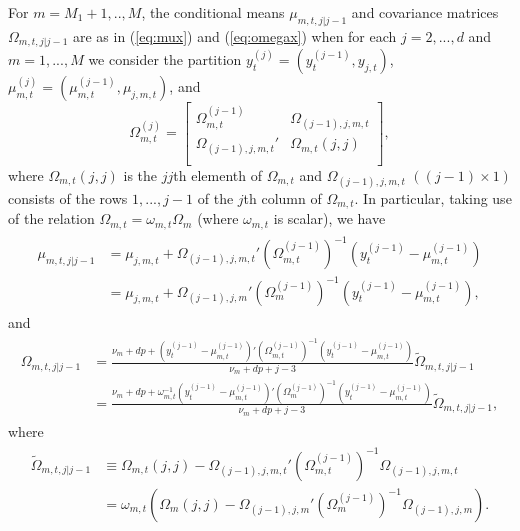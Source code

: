 \documentclass[nojss]{jss} %
\begin{document}
\begin{appendix}
For $m=M_1+1,..,M$, the conditional means $\mu_{m,t,j|j-1}$ and covariance matrices $\Omega_{m,t,j|j-1}$ are as in (\ref{eq:mux}) and (\ref{eq:omegax}) when for each $j=2,...,d$ and $m=1,...,M$ we consider the partition $y_t^{(j)}=(y_t^{(j-1)},y_{j,t})$, $\mu_{m,t}^{(j)}=(\mu_{m,t}^{(j-1)},\mu_{j,m,t})$, and
\begin{equation}
\Omega_{m,t}^{(j)}=
\begin{bmatrix}
\Omega_{m,t}^{(j-1)} \quad\enspace & \Omega_{(j-1),j,m,t} \\
\Omega_{(j-1),j,m,t}' & \Omega_{m,t}(j,j)  \\
\end{bmatrix},
\end{equation}
where $\Omega_{m,t}(j,j)$ is the $jj$th elementh of $\Omega_{m,t}$ and $\Omega_{(j-1),j,m,t}$ $((j-1)\times 1)$  consists of the rows $1,...,j-1$ of the $j$th column of $\Omega_{m,t}$.  In particular,  taking use of the relation $\Omega_{m,t}=\omega_{m,t}\Omega_m$ (where $\omega_{m,t}$ is scalar), we have
\begin{align}
\begin{aligned}
\mu_{m,t,j|j-1} &=\mu_{j,m,t} + \Omega_{(j-1),j,m,t}'(\Omega_{m,t}^{(j-1)})^{-1}(y_t^{(j-1)}-\mu_{m,t}^{(j-1)})\\
&=\mu_{j,m,t} + \Omega_{(j-1),j,m}'(\Omega_{m}^{(j-1)})^{-1}(y_t^{(j-1)}-\mu_{m,t}^{(j-1)}),
\end{aligned}\label{eq:cond_mu_mtj}
\end{align}
and
\begin{align}
\begin{aligned}
\Omega_{m,t,j|j-1} &= \frac{\nu_m + dp + (y_t^{(j-1)} - \mu_{m,t}^{(j - 1)})'(\Omega_{m,t}^{(j-1)})^{-1}(y_t^{(j-1)} - \mu_{m,t}^{(j - 1)})}{\nu_m + dp + j - 3}\tilde{\Omega}_{m,t,j|j-1}\\
&= \frac{\nu_m + dp + \omega_{m,t}^{-1}(y_t^{(j-1)} - \mu_{m,t}^{(j - 1)})'(\Omega_{m}^{(j-1)})^{-1}(y_t^{(j-1)} - \mu_{m,t}^{(j - 1)})}{\nu_m + dp + j - 3}\tilde{\Omega}_{m,t,j|j-1},
\end{aligned}\label{eq:cond_omega_mtj}
\end{align}
where
\begin{align}
\begin{aligned}
\tilde{\Omega}_{m,t,j|j-1} &\equiv \Omega_{m,t}(j,j) - \Omega_{(j-1),j,m,t}'(\Omega_{m,t}^{(j-1)})^{-1} \Omega_{(j-1),j,m,t}\\
&=\omega_{m,t}(\Omega_{m}(j,j) - \Omega_{(j-1),j,m}'(\Omega_{m}^{(j-1)})^{-1} \Omega_{(j-1),j,m}).
\end{aligned}
\end{align}


\end{appendix}
\end{document}
